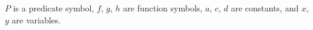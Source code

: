 $P$ is a predicate symbol, $f$, $g$, $h$ are function symbols, $a$, $c$, $d$ are constants, and $x$, $y$ are variables.
